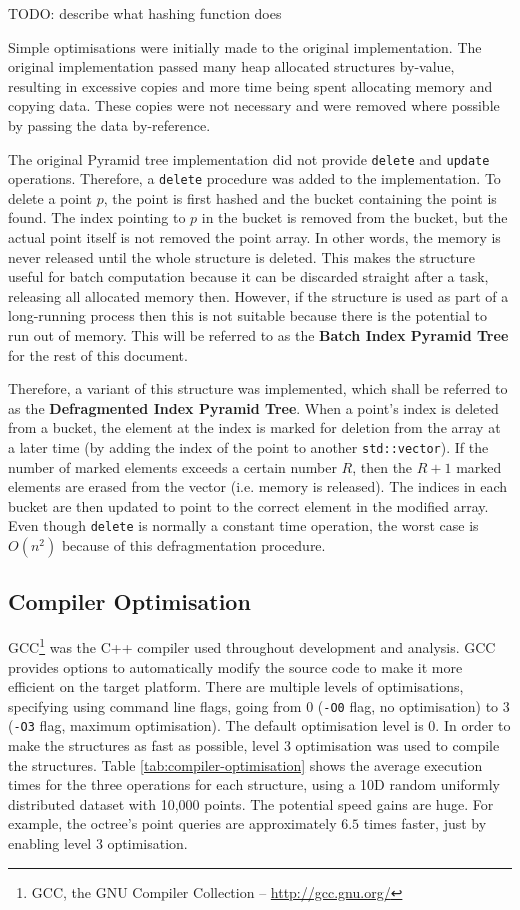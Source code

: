 TODO: describe what hashing function does
 
Simple optimisations were initially made to the original implementation. The original implementation passed many heap allocated structures by-value, resulting in excessive copies and more time being spent allocating memory and copying data. These copies were not necessary and were removed where possible by passing the data by-reference.

The original Pyramid tree implementation did not provide \texttt{delete} and \texttt{update} operations. Therefore, a \texttt{delete} procedure was added to the implementation. To delete a point $p$, the point is first hashed and the bucket containing the point is found. The index pointing to $p$ in the bucket is removed from the bucket, but the actual point itself is not removed the point array. In other words, the memory is never released until the whole structure is deleted. This makes the structure useful for batch computation because it can be discarded straight after a task, releasing all allocated memory then. However, if the structure is used as part of a long-running process then this is not suitable because there is the potential to run out of memory. This will be referred to as the \textbf{Batch Index Pyramid Tree} for the rest of this document.

Therefore, a variant of this structure was implemented, which shall be referred to as the \textbf{Defragmented Index Pyramid Tree}. When a point's index is deleted from a bucket, the element at the index is marked for deletion from the array at a later time (by adding the index of the point to another \texttt{std::vector}). If the number of marked elements exceeds a certain number $R$, then the $R + 1$ marked elements are erased from the vector (i.e. memory is released). The indices in each bucket are then updated to point to the correct element in the modified array. Even though \texttt{delete} is normally a constant time operation, the worst case is $O(n^2)$ because of this defragmentation procedure.

\subsection{Compiler Optimisation}

GCC\footnote{GCC, the GNU Compiler Collection -- \url{http://gcc.gnu.org/}} was the C++ compiler used throughout development and analysis. GCC provides options to automatically modify the source code to make it more efficient on the target platform. There are multiple levels of optimisations, specifying using command line flags, going from 0 (\texttt{-O0} flag, no optimisation) to 3 (\texttt{-O3} flag, maximum optimisation). The default optimisation level is 0. In order to make the structures as fast as possible, level 3 optimisation was used to compile the structures. Table \ref{tab:compiler-optimisation} shows the average execution times for the three operations for each structure, using a 10D random uniformly distributed dataset with 10,000 points. The potential speed gains are huge. For example, the octree's point queries are approximately $6.5$ times faster, just by enabling level 3 optimisation.


